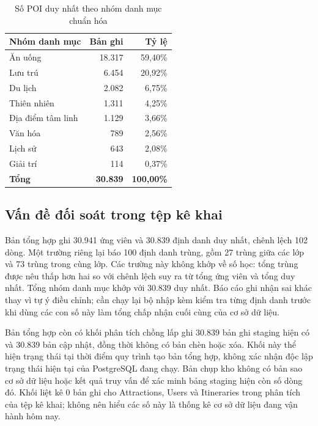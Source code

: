 \begin{table}[htbp]
    \centering
    \caption{Số POI duy nhất theo nhóm danh mục chuẩn hóa}
    \label{tab:osm_group_profile}
    \renewcommand{\arraystretch}{1.2}
    \begin{tabularx}{0.78\textwidth}{>{\raggedright\arraybackslash}X r r}
        \toprule
        \textbf{Nhóm danh mục} & \textbf{Bản ghi} & \textbf{Tỷ lệ} \\
        \midrule
        Ăn uống & 18.317 & 59,40\% \\
        Lưu trú & 6.454 & 20,92\% \\
        Du lịch & 2.082 & 6,75\% \\
        Thiên nhiên & 1.311 & 4,25\% \\
        Địa điểm tâm linh & 1.129 & 3,66\% \\
        Văn hóa & 789 & 2,56\% \\
        Lịch sử & 643 & 2,08\% \\
        Giải trí & 114 & 0,37\% \\
        \midrule
        \textbf{Tổng} & \textbf{30.839} & \textbf{100,00\%} \\
        \bottomrule
    \end{tabularx}
\end{table}

\subsection{Vấn đề đối soát trong tệp kê khai}

Bản tổng hợp ghi 30.941 ứng viên và 30.839 định danh duy nhất, chênh lệch 102 dòng. Một trường riêng lại báo 100 định danh trùng, gồm 27 trùng giữa các lớp và 73 trùng trong cùng lớp. Các trường này không khớp về số học: tổng trùng được nêu thấp hơn hai so với chênh lệch suy ra từ tổng ứng viên và tổng duy nhất. Tổng nhóm danh mục khớp với 30.839 duy nhất. Báo cáo ghi nhận sai khác thay vì tự ý điều chỉnh; cần chạy lại bộ nhập kèm kiểm tra từng định danh trước khi dùng các con số này làm tổng chấp nhận cuối cùng của cơ sở dữ liệu.

Bản tổng hợp còn có khối phân tích chồng lấp ghi 30.839 bản ghi staging hiện có và 30.839 bản cập nhật, đồng thời không có bản chèn hoặc xóa. Khối này thể hiện trạng thái tại thời điểm quy trình tạo bản tổng hợp, không xác nhận độc lập trạng thái hiện tại của PostgreSQL đang chạy. Bản chụp kho không có bản sao cơ sở dữ liệu hoặc kết quả truy vấn để xác minh bảng staging hiện còn số dòng đó. Khối  liệt kê 0 bản ghi cho Attractions, Users và Itineraries trong phân tích của tệp kê khai; không nên hiểu các số này là thống kê cơ sở dữ liệu đang vận hành hôm nay.

